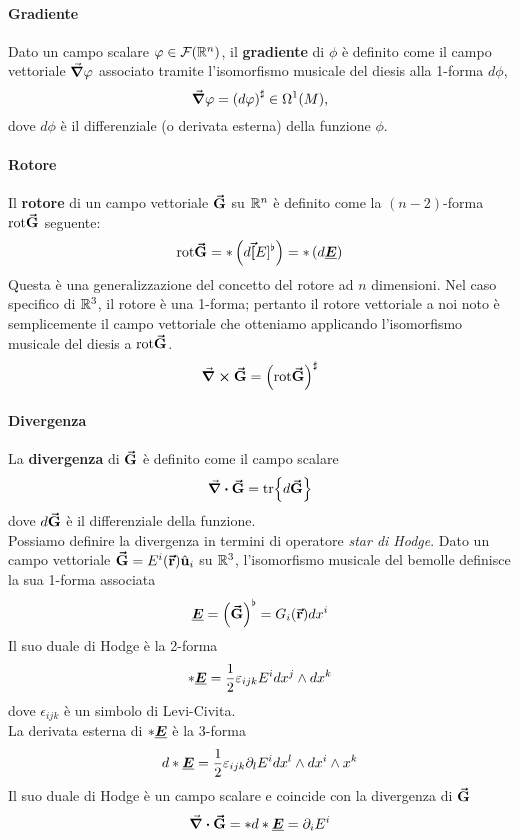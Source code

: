 \paragraph{Gradiente}
Dato un campo scalare $\varphi\in\mathcal{F}(\mathbb{R}^n)$, il \textbf{gradiente} di $\phi$ è definito come il campo vettoriale $\grad{\varphi}$ associato tramite l'isomorfismo musicale del diesis alla 1-forma $d\phi$,
\begin{equation}
	\grad{\varphi}=\left(d\varphi\right)^{\sharp}\in\Omega^1(M),
\end{equation}
dove $d\phi$ è il differenziale (o derivata esterna) della funzione $\phi$.
\paragraph{Rotore}
Il \textbf{rotore} di un campo vettoriale $\vb*{\va{G}}$ su $\mathbb{R}^n$ è definito come la $(n-2)$-forma $\mathrm{rot}\vb*{\va{G}}$ seguente:
\begin{equation*}
	\mathrm{rot}\vb*{\va{G}}=\ast\left(d\vb*{\va{[}}E]^\flat\right)=\ast\left(d\vb*{\underline{E}}\right)
\end{equation*}
Questa è una generalizzazione del concetto del rotore ad $n$ dimensioni. Nel caso specifico di $\mathbb{R}^3$, il rotore è una 1-forma; pertanto il rotore vettoriale a noi noto è semplicemente il campo vettoriale che otteniamo applicando l'isomorfismo musicale del diesis a $\mathrm{rot}\vb*{\va{G}}$.
\begin{equation}
	\curl{\vb*{\va{G}}}=\left(\mathrm{rot}\vb*{\va{G}}\right)^\sharp
\end{equation}
\paragraph{Divergenza}
La \textbf{divergenza} di $\vb*{\va{G}}$ è definito come il campo scalare
\begin{equation}
	\div{\vb*{\va{G}}}=\tr{d\vb*{\va{G}}}
\end{equation}
dove $d\vb*{\va{G}}$ è il differenziale della funzione.\\
Possiamo definire la divergenza in termini di operatore \textit{star di Hodge}. Dato un campo vettoriale $\vb*{\va{G}}=E^i(\vb*{\va{r}})\hat{\mathbf{u}}_i$ su $\mathbb{R}^3$, l'isomorfismo musicale del bemolle definisce la sua 1-forma associata
\begin{equation*}
	\vb*{\underline{E}}=\left(\vb*{\va{G}}\right)^\flat=G_i(\vb*{\va{r}})dx^i
\end{equation*}
Il suo duale di Hodge è la 2-forma
\begin{equation*}
	\ast\vb*{\underline{E}}=\frac{1}{2}\varepsilon_{ijk}E^idx^j\wedge dx^k
\end{equation*}
dove $\epsilon_{ijk}$ è un simbolo di Levi-Civita.\\
La derivata esterna di $\ast\vb*{\underline{E}}$ è la 3-forma
\begin{equation*}
	d\ast\vb*{\underline{E}}=\frac{1}{2}\varepsilon_{ijk}\partial_lE^idx^{l}\wedge dx^i\wedge x^k
\end{equation*}
Il suo duale di Hodge è un campo scalare e coincide con la divergenza di $\vb*{\va{G}}$  
\begin{equation}
	\div{\vb*{\va{G}}}=\ast d\ast\vb*{\underline{E}}=\partial_i E^i
\end{equation}
